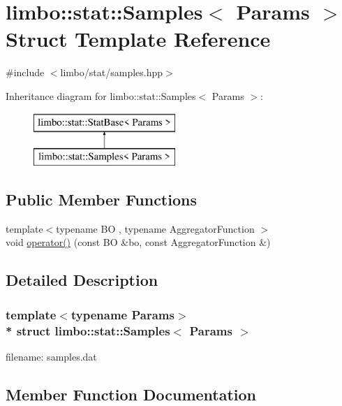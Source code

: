 \hypertarget{structlimbo_1_1stat_1_1_samples}{}\section{limbo\+:\+:stat\+:\+:Samples$<$ Params $>$ Struct Template Reference}
\label{structlimbo_1_1stat_1_1_samples}


{\ttfamily \#include $<$limbo/stat/samples.\+hpp$>$}

Inheritance diagram for limbo\+:\+:stat\+:\+:Samples$<$ Params $>$\+:\begin{figure}[H]
\begin{center}
\leavevmode
\includegraphics[height=2.000000cm]{structlimbo_1_1stat_1_1_samples}
\end{center}
\end{figure}
\subsection*{Public Member Functions}
\begin{DoxyCompactItemize}
\item 
{\footnotesize template$<$typename BO , typename Aggregator\+Function $>$ }\\void \hyperlink{structlimbo_1_1stat_1_1_samples_a456da8be91bd02cf82121d80d7531123}{operator()} (const BO \&bo, const Aggregator\+Function \&)
\end{DoxyCompactItemize}


\subsection{Detailed Description}
\subsubsection*{template$<$typename Params$>$\\*
struct limbo\+::stat\+::\+Samples$<$ Params $>$}

filename\+: {\ttfamily samples.\+dat} 

\subsection{Member Function Documentation}
